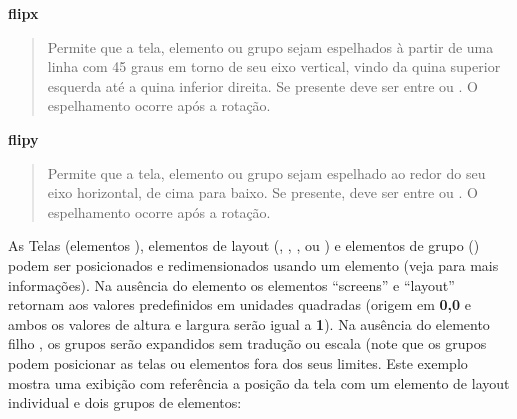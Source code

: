 \documentclass[letterpaper,10pt,brazil]{sphinxmanual}
\begin{document}
\textbf{flipx}
\begin{quote}

Permite que a tela, elemento ou grupo sejam espelhados à partir de
uma linha com 45 graus em torno de seu eixo vertical, vindo da quina
superior esquerda até a quina inferior direita. Se presente deve ser
entre  ou .
O espelhamento ocorre após a rotação.
\end{quote}

\textbf{flipy}
\begin{quote}

Permite que a tela, elemento ou grupo sejam espelhado ao redor do seu
eixo horizontal, de cima para baixo. Se presente, deve ser entre
 ou . O espelhamento ocorre após a rotação.
\end{quote}

As Telas (elementos ), elementos de layout
(, , ,  ou ) e
elementos de grupo () podem ser posicionados e redimensionados
usando um elemento 
(veja {\hyperref[techspecs/layout_files:layout\string-concepts\string-coordinates]{}} para mais informações).
Na ausência do elemento  os elementos ``screens'' e ``layout''
retornam aos valores predefinidos em unidades quadradas (origem em
\textbf{0,0} e ambos os valores de altura e largura serão igual a \textbf{1}).
Na ausência do elemento filho , os grupos serão expandidos sem
tradução ou escala (note que os grupos podem posicionar as telas ou
elementos fora dos seus limites. Este exemplo mostra uma exibição
com referência a posição da tela com um elemento de layout individual e
dois grupos de elementos:
\end{document}
